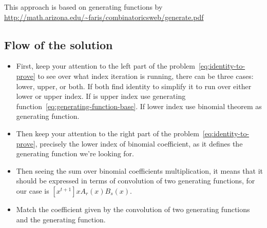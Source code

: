 This approach is based on generating functions
by \url{http://math.arizona.edu/~faris/combinatoricsweb/generate.pdf}

\subsection{Flow of the solution}
\label{subsec:flow-of-the-solution}
\begin{itemize}
    \item First, keep your attention to the left part of the problem~\eqref{eq:identity-to-prove}
    to see over what index iteration is running, there can be three cases: lower, upper, or both.
    If both find identity to simplify it to run over either lower or upper index.
    If is upper index use generating function~\eqref{eq:generating-function-base}.
    If lower index use binomial theorem as generating function.
    \item Then keep your attention to the right part of the problem~\eqref{eq:identity-to-prove},
    precisely the lower index of binomial coefficient, as it defines the generating function
    we're looking for.
    \item Then seeing the sum over binomial coefficients multiplication,
    it means that it should be expressed in terms of convolution of two generating functions,
    for our case is $[x^{t+1}] x A_r(x) B_s(x)$.
    \item Match the coefficient given by the convolution of two generating functions and the generating function.
\end{itemize}


\clearpage
